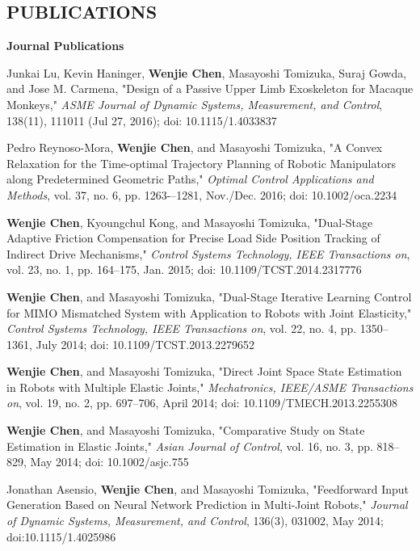 \documentclass{res}
\begin{document}
\begin{resume}
\section{PUBLICATIONS}
\vspace{0.1in}
    \textbf{Journal Publications} %
    \begin{etaremune}[start=7]
    \item Junkai Lu, Kevin Haninger, \textbf{Wenjie Chen}, Masayoshi Tomizuka, Suraj Gowda, and Jose M. Carmena, "Design of a Passive Upper Limb Exoskeleton for Macaque Monkeys," \emph{ASME Journal of Dynamic Systems, Measurement, and Control}, 138(11), 111011 (Jul 27, 2016); doi: 10.1115/1.4033837
    \item Pedro Reynoso-Mora, \textbf{Wenjie Chen}, and Masayoshi Tomizuka, "A Convex Relaxation for the Time-optimal Trajectory Planning of Robotic Manipulators along Predetermined Geometric Paths," \emph{Optimal Control Applications and Methods}, vol. 37, no. 6, pp. 1263-–1281, Nov./Dec. 2016; doi: 10.1002/oca.2234
    \item \textbf{Wenjie Chen}, Kyoungchul Kong, and Masayoshi Tomizuka, "Dual-Stage Adaptive Friction Compensation for Precise Load Side Position Tracking of Indirect Drive Mechanisms," \emph{Control Systems Technology, IEEE Transactions on}, vol. 23, no. 1, pp. 164--175, Jan. 2015;  doi: 10.1109/TCST.2014.2317776
    \item \textbf{Wenjie Chen}, and Masayoshi Tomizuka, "Dual-Stage Iterative Learning Control for MIMO Mismatched System with Application to Robots with Joint Elasticity," \emph{Control Systems Technology, IEEE Transactions on}, vol. 22, no. 4, pp. 1350--1361, July 2014; doi: 10.1109/TCST.2013.2279652
    \item \textbf{Wenjie Chen}, and Masayoshi Tomizuka, "Direct Joint Space State Estimation in Robots with Multiple Elastic Joints," \emph{Mechatronics, IEEE/ASME Transactions on}, vol. 19, no. 2, pp. 697--706, April 2014; doi: 10.1109/TMECH.2013.2255308
    \item \textbf{Wenjie Chen}, and Masayoshi Tomizuka, "Comparative Study on State Estimation in Elastic Joints," \emph{Asian Journal of Control}, vol. 16, no. 3, pp. 818--829, May 2014; doi: 10.1002/asjc.755%
    \item Jonathan Asensio, \textbf{Wenjie Chen}, and Masayoshi Tomizuka, "Feedforward Input Generation Based on Neural Network Prediction in Multi-Joint Robots," \emph{Journal of Dynamic Systems, Measurement, and Control}, 136(3), 031002, May 2014;   doi:10.1115/1.4025986
    \end{etaremune}


\end{resume}
\end{document}
